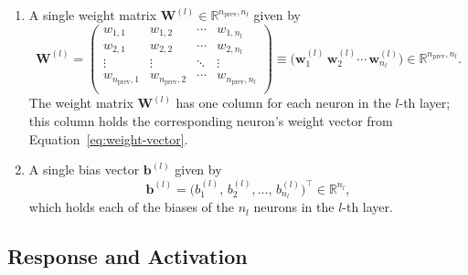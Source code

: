 \documentclass[11pt, a4paper]{article}
\renewcommand{\vec}[1]{\bm{#1}}
\newcommand{\mat}[1]{\mathbf{#1}}
\newcommand{\W}{\mat{W}}
\newcommand{\w}{\vec{w}}
\renewcommand{\b}{\vec{b}}
\begin{document}
\begin{enumerate}

    \item A single weight matrix $ \W^{(l)} \in \mathbb{R}^{n_{\text{prev}}, n_{l}} $ given by
    \begin{equation}
        \W^{(l)} =
        \begin{pmatrix}
            w_{1, 1} & w_{1, 2} & \cdots & w_{1, n_{l}}\\
            w_{2, 1} & w_{2, 2} & \cdots & w_{2, n_{l}}\\
            \vdots & \vdots & \ddots & \vdots\\
            w_{n_{\text{prev}}, 1} & w_{n_{\text{prev}}, 2} & \cdots & w_{n_{\text{prev}}, n_{l}}\\
        \end{pmatrix}
        \equiv \Big( \w_{1}^{(l)} \, \w_{2}^{(l)} \cdots \, \w_{n_{l}}^{(l)} \Big) \in \mathbb{R}^{n_{\text{prev}}, n_{l}}. \label{eq:weight-matrix}
    \end{equation}
    The weight matrix $ \W^{(l)} $ has one column for each neuron in the $ l $-th layer; this column holds the corresponding neuron's weight vector from Equation~\ref{eq:weight-vector}.

    \item A single bias vector $ \b^{(l)} $ given by
    \begin{equation}
        \b^{(l)} = \Big( b_{1}^{(l)}, \, b_{2}^{(l)}, \ldots, \, b_{n_{l}}^{(l)} \Big)^{\top} \in \mathbb{R}^{n_{l}}, \label{eq:bias-vector}
    \end{equation}
    which holds each of the biases of the $ n_{l} $ neurons in the $ l $-th layer.


\end{enumerate}


\subsection{Response and Activation} \label{ss:response-activation}
\end{document}
